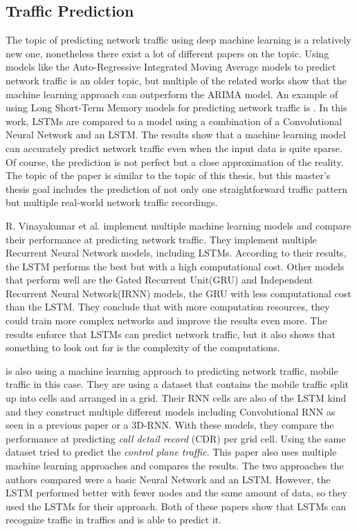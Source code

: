 \subsection{Traffic Prediction}
The topic of predicting network traffic using deep machine learning is a relatively new one, nonetheless there exist a lot of different papers on the topic.
Using models like the Auto-Regressive Integrated Moving Average models to predict network traffic is an older topic, but multiple of the related works show that the machine learning approach can outperform the ARIMA model.
An example of using Long Short-Term Memory models for predicting network traffic is \cite{8717800}.
In this work, LSTMs are compared to a model using a combination of a Convolutional Neural Network and an LSTM.
The results show that a machine learning model can accurately predict network traffic even when the input data is quite sparse.
Of course, the prediction is not perfect but a close approximation of the reality.
The topic of the paper is similar to the topic of this thesis, but this master's thesis goal includes the prediction of not only one straightforward traffic pattern but multiple real-world network traffic recordings.

R. Vinayakumar et al. \cite{deepLearningApproaches} implement multiple machine learning models and compare their performance at predicting network traffic.
They implement multiple Recurrent Neural Network models, including LSTMs.
According to their results, the LSTM performs the best but with a high computational cost.
Other models that perform well are the Gated Recurrent Unit(GRU) and Independent Recurrent Neural Network(IRNN) models, the GRU with less computational cost than the LSTM.
They conclude that with more computation resources, they could train more complex networks and improve the results even more.
The results enforce that LSTMs can predict network traffic, but it also shows that something to look out for is the complexity of the computations.

\cite{8292737} is also using a machine learning approach to predicting network traffic, mobile traffic in this case.
They are using a dataset that contains the mobile traffic split up into cells and arranged in a grid.
Their RNN cells are also of the LSTM kind and they construct multiple different models including Convolutional RNN as seen in a previous paper or a 3D-RNN.
With these models, they compare the performance at predicting \textit{call detail record} (CDR) per grid cell.
Using the same dataset \cite{8553653} tried to predict the \textit{control plane traffic}.
This paper also uses multiple machine learning approaches and compares the results.
The two approaches the authors compared were a basic Neural Network and an LSTM.
However, the LSTM performed better with fewer nodes and the same amount of data, so they used the LSTMs for their approach.
Both of these papers show that LSTMs can recognize traffic in traffics and is able to predict it.

